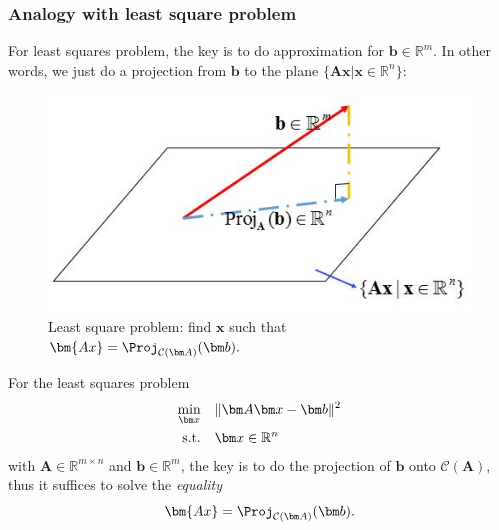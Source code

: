 \subsubsection{Analogy with least square problem}
For least squares problem, the key is to do approximation for $\bm b\in\mathbb{R}^m$. In other words, we just do a projection from $\bm b$ to the plane $\{\bm{Ax}|\bm x\in\mathbb{R}^n\}$:
\begin{figure}[H]
\centering\includegraphics{week7/least_square}
\caption{Least square problem: find $\bm x$ such that $\bm{Ax}=\Proj_{\mathcal{C}(\bm A)}(\bm b).$}
\end{figure}
\begin{remark}
For the least squares problem
\begin{align*}
  \min_{\bm x}\quad        & \|\bm A\bm x-\bm b\|^2 \\
  \text{s.t.\quad} &  \bm x\in\mathbb{R}^{n}
\end{align*}
with $\bm A\in\mathbb{R}^{m\times n}$ and $\bm b\in\mathbb{R}^m$, the key is to do the projection of $\bm b$ onto $\mathcal{C}(\bm A)$, thus it suffices to solve the \emph{equality}
\[
\bm{Ax}=\Proj_{\mathcal{C}(\bm A)}(\bm b).
\]
\end{remark}




